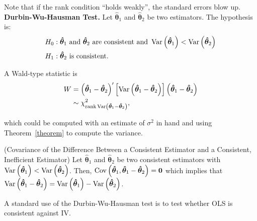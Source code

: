 \noindent Note that if the rank condition ``holds weakly'', the standard errors blow up.\\

\noindent \textbf{Durbin-Wu-Hausman Test.} Let $\bm{\hat{\theta}}_1$ and $\bm{\hat{\theta}}_2$ be two estimators. The hypothesis is: 
\begin{align}
	H_0 & : \bm{\hat{\theta}}_1 \text{ and } \bm{\hat{\theta}}_2 \text{ are consistent and } \operatorname{Var} \left( \bm{\hat{\theta}}_1 \right) <  \operatorname{Var} \left( \bm{\hat{\theta}}_2 \right) \nonumber \\ 
	H_1 & : \bm{\hat{\theta}}_2 \text{ is consistent}. \nonumber
\end{align}

\noindent A Wald-type statistic is 
\begin{align}
	W & = \left( \bm{\hat{\theta}}_1 - \bm{\hat{\theta}}_2 \right)' \left[ \operatorname{Var} \left( \bm{\hat{\theta}}_1 - \bm{\hat{\theta}}_2 \right) \right] \left( \bm{\hat{\theta}}_1 - \bm{\hat{\theta}}_2 \right) \nonumber \\
	  & \sim \chi_{\text{rank} \operatorname{Var} \left(\bm{\hat{\theta}}_1 - \bm{\hat{\theta}}_2 \right)}^2, 
\end{align}

\noindent which could be computed with an estimate of $\sigma^2$ in hand and using Theorem~\ref{theorem} to compute the variance.

\begin{theorem} \label{theorem} (Covariance of the Difference Between a Consistent Estimator and a Consistent, Inefficient Estimator) Let $\bm{\hat{\theta}}_1$ and $\bm{\hat{\theta}}_2$ be two consistent estimators with $\operatorname{Var} \left( \bm{\hat{\theta}}_1 \right) <  \operatorname{Var} \left( \bm{\hat{\theta}}_2 \right)$. Then, $\operatorname{Cov} \left( \bm{\hat{\theta}}_1, \bm{\hat{\theta}}_1 - \bm{\hat{\theta}}_2 \right) = \bm{0}$ which implies that $\operatorname{Var} \left( \bm{\hat{\theta}}_1 - \bm{\hat{\theta}}_2 \right) = \operatorname{Var} \left( \bm{\hat{\theta}}_1 \right) - \operatorname{Var} \left( \bm{\hat{\theta}}_2 \right)$. 
\end{theorem}

\noindent A standard use of the Durbin-Wu-Hausman test is to test whether OLS is consistent against IV.


